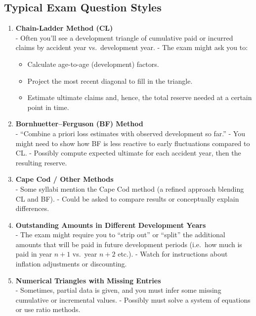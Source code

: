 \documentclass[13pt,a4paper]{article}
\begin{document}
\subsection{Typical Exam Question Styles}
\begin{enumerate}
  \item \textbf{Chain-Ladder Method (CL)}\\
    - Often you’ll see a development triangle of cumulative paid or incurred claims by accident year vs.\ development year.
    - The exam might ask you to:
      \begin{itemize}
        \item Calculate age-to-age (development) factors.
        \item Project the most recent diagonal to fill in the triangle.
        \item Estimate ultimate claims and, hence, the total reserve needed at a certain point in time.
      \end{itemize}

  \item \textbf{Bornhuetter–Ferguson (BF) Method}\\
    - “Combine a priori loss estimates with observed development so far.”
    - You might need to show how BF is less reactive to early fluctuations compared to CL.
    - Possibly compute expected ultimate for each accident year, then the resulting reserve.

  \item \textbf{Cape Cod / Other Methods}\\
    - Some syllabi mention the Cape Cod method (a refined approach blending CL and BF). 
    - Could be asked to compare results or conceptually explain differences.

  \item \textbf{Outstanding Amounts in Different Development Years}\\
    - The exam might require you to “strip out” or “split” the additional amounts that will be paid in future development periods (i.e.\ how much is paid in year \(n+1\) vs.\ year \(n+2\) etc.).
    - Watch for instructions about inflation adjustments or discounting.

  \item \textbf{Numerical Triangles with Missing Entries}\\
    - Sometimes, partial data is given, and you must infer some missing cumulative or incremental values. 
    - Possibly must solve a system of equations or use ratio methods.

\end{enumerate}
\end{document}
